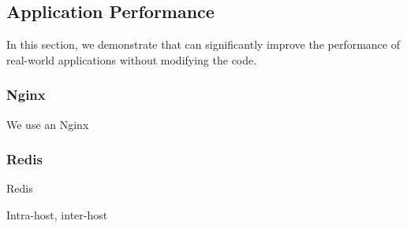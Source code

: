 \subsection{Application Performance}
\label{subsec:application}


In this section, we demonstrate that \sys{} can significantly improve the performance of real-world applications without modifying the code.

\subsubsection{Nginx}

We use an Nginx~\cite{nginx}

\subsubsection{Redis}

Redis~\cite{redis}

Intra-host, inter-host




